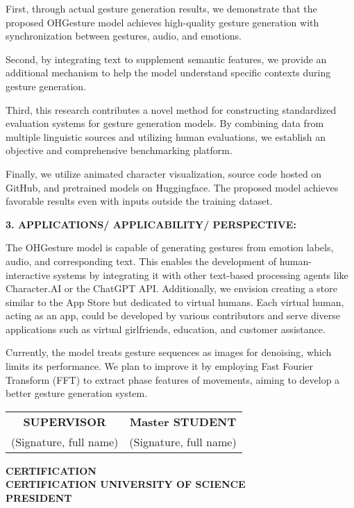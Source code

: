 First, through actual gesture generation results, we demonstrate that the proposed OHGesture model achieves high-quality gesture generation with synchronization between gestures, audio, and emotions.

Second, by integrating text to supplement semantic features, we provide an additional mechanism to help the model understand specific contexts during gesture generation.

Third, this research contributes a novel method for constructing standardized evaluation systems for gesture generation models. By combining data from multiple linguistic sources and utilizing human evaluations, we establish an objective and comprehensive benchmarking platform.

Finally, we utilize animated character visualization, source code hosted on GitHub, and pretrained models on Huggingface. The proposed model achieves favorable results even with inputs outside the training dataset.

\vspace{5pt}
{\MakeUppercase\Large \bfseries 3. APPLICATIONS/ APPLICABILITY/ PERSPECTIVE:}

The OHGesture model is capable of generating gestures from emotion labels, audio, and corresponding text. This enables the development of human-interactive systems by integrating it with other text-based processing agents like Character.AI or the ChatGPT API. Additionally, we envision creating a store similar to the App Store but dedicated to virtual humans. Each virtual human, acting as an app, could be developed by various contributors and serve diverse applications such as virtual girlfriends, education, and customer assistance.

Currently, the model treats gesture sequences as images for denoising, which limits its performance. We plan to improve it by employing Fast Fourier Transform (FFT) to extract phase features of movements, aiming to develop a better gesture generation system.

\begin{center}
    \begin{tabular}{c c}
        \textbf{SUPERVISOR} & \textbf{Master STUDENT} \\
        (Signature, full name) & (Signature, full name) \\
    \end{tabular}
    
    \vspace{2.5cm} %
    
    \textbf{CERTIFICATION} \\
    \textbf{CERTIFICATION UNIVERSITY OF SCIENCE} \\
    \textbf{PRESIDENT}
\end{center}

\pagebreak